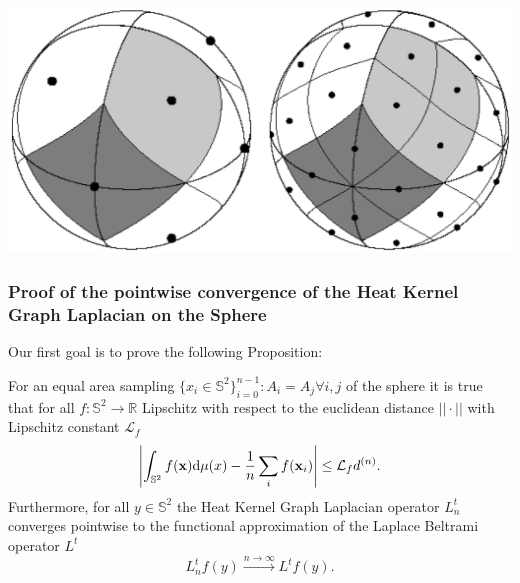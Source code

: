 \hfill
\begin{minipage}{.5\textwidth}
	\centering
	\includegraphics[width=\linewidth]{figs/chapter1/Heal_Base.png}
	\vspace{0.5cm}
\end{minipage}

\subsubsection{Proof of the pointwise convergence of the Heat Kernel Graph Laplacian on the Sphere}

Our first goal is to prove the following Proposition: 
\vspace{0.5cm}
\begin{prop}\label{prop:1}
	For an equal area sampling $\{x_i\in\mathbb S^2\}_{i=0}^{n-1}: A_i=A_j \forall i,j$ of the sphere it is true that for all $f: \mathbb S^2 \rightarrow \mathbb R$ Lipschitz with respect to the euclidean distance $||\cdot||$ with Lipschitz constant $\mathcal L_f$ 
	$$
	\left| \int_{\mathbb S^2}f({\bf x})\text{d}{\mu(x)} - \frac{1}{n}\sum_i f(\mathbf x_i)\right|\leq \mathcal L_fd^{(n)}.
	$$
	Furthermore, for all $y\in\mathbb S^2$ the Heat Kernel Graph Laplacian operator $L^t_n$ converges pointwise to the functional approximation of the Laplace Beltrami operator $L^t$
	$$ L_n^tf(y)\xrightarrow{n\to\infty} L^tf(y).$$
\end{prop} 
\vspace{0.5cm}



